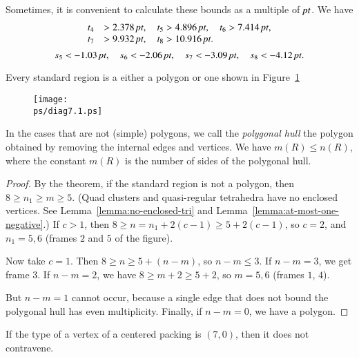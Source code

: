 Sometimes, it is convenient to calculate these bounds as a multiple
of $\hbox{\it pt}$.  We have
    $$
    \begin{array}{lll}
    t_4&>2.378\,\hbox{\it pt},\quad t_5>4.896\,\hbox{\it pt},\quad
    t_6>7.414\,\hbox{\it pt},\\
    t_7&>9.932\,\hbox{\it pt},\quad
    t_8>10.916\,\hbox{\it pt}.
    \end{array}
    $$
    $$
    s_5 < -1.03\,\hbox{\it pt},\quad s_6<-2.06\,\hbox{\it pt},\quad
    s_7<-3.09\,\hbox{\it pt},\quad s_8<-4.12\,\hbox{\it pt}.
    $$




\begin{corollary}
    \label{cor:std-aggregate-list}
Every standard region is a either a polygon or one shown in
Figure~\ref{fig:std-aggregates}
\end{corollary}



\begin{figure}[htb]
  \centering
  \texttt{[image: \\ps/diag7.1.ps]}
  \caption{}
  \label{fig:std-aggregates}
\end{figure}


In the cases that are not (simple) polygons, we call the {\it polygonal
hull\/} the polygon obtained by removing the internal edges and
vertices. We have $m(R)\le n(R)$, where the constant $m(R)$ is the
number of sides of the polygonal hull.

\begin{proof}
By the theorem, if the standard region is not a polygon, then $8\ge
n_1\ge m\ge 5$. (Quad clusters and quasi-regular tetrahedra have no
enclosed vertices. See Lemma~\ref{lemma:no-enclosed-tri} and
Lemma~\ref{lemma:at-most-one-negative}.) If $c>1$, then $8\ge
n=n_1+2(c-1)\ge 5+2(c-1)$, so $c=2$, and $n_1=5,6$ (frames $2$ and $5$
of the figure).

Now take $c=1$.    Then $8\ge n\ge 5+(n-m)$, so $n-m\le 3$.  If $n-m=3$,
we get frame $3$. If $n-m=2$, we have $8\ge m+2\ge 5+2$, so $m=5,6$
(frames $1$, $4$).

But $n-m=1$ cannot occur, because a single edge that does not bound the
polygonal hull has even multiplicity.  Finally, if $n-m=0$, we have a
polygon.
\end{proof}

\begin{corollary} \label{lemma:70}
If the type of a vertex of a centered packing is $(7,0)$, then it
does not contravene.
\end{corollary}

